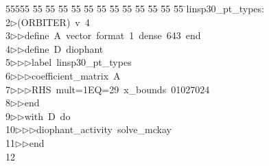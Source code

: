%
%
\begin{tabbing}
55555 \= 55 \= 55 \= 55 \= 55 \= 55 \= 55 \= 55 \= 55 \= 55 \= 55 \= 55 \= 55 \= \>linsp30\_pt\_types:\\[0pt]
2\>$\triangleright$\>(ORBITER)\ v\ 4\ \\[0pt]
3\>$\triangleright$\>$\triangleright$\>define\ A\ vector\ format\ 1\ dense\ 643\ end\ \\[0pt]
4\>$\triangleright$\>$\triangleright$\>define\ D\ diophant\ \\[0pt]
5\>$\triangleright$\>$\triangleright$\>$\triangleright$\>label\ linsp30\_pt\_types\ \\[0pt]
6\>$\triangleright$\>$\triangleright$\>$\triangleright$\>coefficient\_matrix\ A\ \\[0pt]
7\>$\triangleright$\>$\triangleright$\>$\triangleright$\>RHS\ mult=1EQ=29\ x\_bounds\ 01027024\ \\[0pt]
8\>$\triangleright$\>$\triangleright$\>end\ \\[0pt]
9\>$\triangleright$\>$\triangleright$\>with\ D\ do\ \\[0pt]
10\>$\triangleright$\>$\triangleright$\>$\triangleright$\>diophant\_activity\ solve\_mckay\ \\[0pt]
11\>$\triangleright$\>$\triangleright$\>end\\[0pt]
12\>\end{tabbing}
